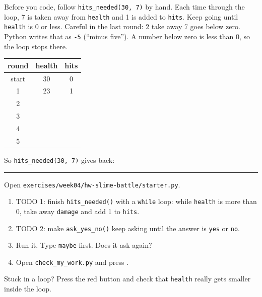 \namedateline

\begin{core}
Before you code, follow \texttt{hits\_needed(30, 7)} by hand. Each time through the loop, 7 is taken away from \texttt{health}
and 1 is added to \texttt{hits}. Keep going until \texttt{health} is 0 or less.
Careful in the last round: 2 take away 7 goes below zero. Python writes that as \texttt{-5} (\enquote{minus five}).
A number below zero is less than 0, so the loop stops there.
\begin{center}
\renewcommand{\arraystretch}{1.5}
\begin{tabular}{|c|c|c|}
\hline
\textbf{round} & \textbf{health} & \textbf{hits} \\ \hline
start & 30 & 0 \\ \hline
1 & 23 & 1 \\ \hline
2 & & \\ \hline
3 & & \\ \hline
4 & & \\ \hline
5 & & \\ \hline
\end{tabular}
\end{center}
So \texttt{hits\_needed(30, 7)} gives back: \rule{2cm}{0.4pt}
\end{core}

\begin{core}
Open \texttt{exercises/week04/hw-slime-battle/starter.py}.
\begin{enumerate}[leftmargin=1.4em]
  \item TODO 1: finish \texttt{hits\_needed()} with a \texttt{while} loop: while \texttt{health} is more than 0, take away \texttt{damage}
        and add 1 to \texttt{hits}.
  \item TODO 2: make \texttt{ask\_yes\_no()} keep asking until the answer is \texttt{yes} or \texttt{no}.
  \item Run it. Type \texttt{maybe} first. Does it ask again? \tickbox
  \item Open \texttt{check\_my\_work.py} and press .
\end{enumerate}
Stuck in a loop? Press the red  button and check that \texttt{health} really gets smaller inside the loop.
\end{core}

